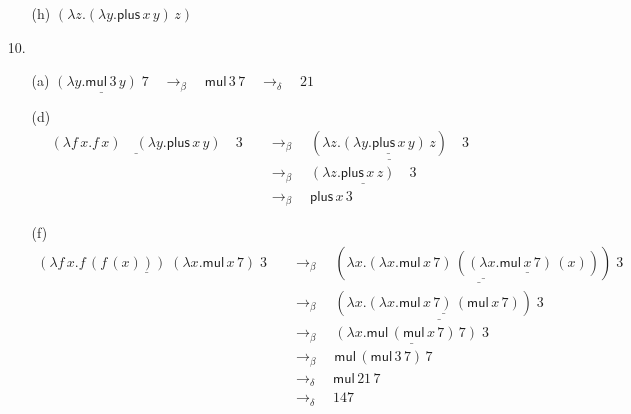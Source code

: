 \documentclass[a4paper,11pt]{article}
\begin{document}
\begin{enumerate}
\begin{enumerate}
\item[(h)] $(\lambda z. (\lambda y. \textsf{plus} \, x \, y) \, z)$

\end{enumerate}


\item[10.]

\begin{enumerate}

\item[(a)]
$\underline{(\lambda y. \textsf{mul} \, 3 \, y) \; 7}
  \quad \rightarrow_{\beta} \quad
  \textsf{mul} \, 3 \, 7
  \quad \rightarrow_{\delta} \quad
  21$

\item[(d)]
\begin{align*}
  \underline{(\lambda f \, x. f \, x) \quad (\lambda y. \textsf{plus} \, x \, y)} \quad 3
  & \quad \rightarrow_{\beta} \quad
  \underline{(\lambda z. \underline{(\lambda y. \textsf{plus} \, x \, y) \, z}) \quad 3} \\
  & \quad \rightarrow_{\beta} \quad
  \underline{(\lambda z. \textsf{plus} \, x \, z) \quad 3} \\
  & \quad \rightarrow_{\beta} \quad
  \textsf{plus} \, x \, 3
\end{align*}

\item[(f)]
\begin{align*}
  \underline{(\lambda f \, x. f \, (f \, (x))) \; (\lambda x. \textsf{mul} \, x \, 7)} \; 3
  & \quad \rightarrow_{\beta} \quad
  \underline{(\lambda x. \underline{(\lambda x. \textsf{mul} \, x \, 7) \, (\underline{(\lambda x. \textsf{mul} \, x \, 7) \, (x)})}) \; 3} \\
  & \quad \rightarrow_{\beta} \quad
  \underline{(\lambda x. \underline{(\lambda x. \textsf{mul} \, x \, 7) \, (\textsf{mul} \, x \, 7)}) \; 3} \\
  & \quad \rightarrow_{\beta} \quad
  \underline{(\lambda x. \textsf{mul} \, (\textsf{mul} \, x \, 7) \, 7) \; 3} \\
  & \quad \rightarrow_{\beta} \quad
  \textsf{mul} \, (\textsf{mul} \, 3 \, 7) \, 7 \\
  & \quad \rightarrow_{\delta} \quad
  \textsf{mul} \, 21 \, 7 \\
  & \quad \rightarrow_{\delta} \quad
  147
\end{align*}

\end{enumerate}


\end{enumerate}
\end{document}
